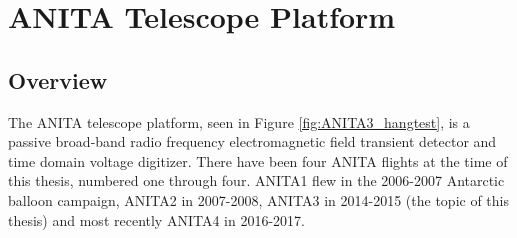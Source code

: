 
\chapter{ANITA Telescope Platform}
\section{Overview}
	The ANITA telescope platform, seen in Figure \ref{fig:ANITA3_hangtest}, is a passive broad-band radio frequency electromagnetic field transient detector and time domain voltage digitizer.  There have been four ANITA flights at the time of this thesis, numbered one through four.  ANITA1 flew in the 2006-2007 Antarctic balloon campaign\cite{ANITA1}, ANITA2 in 2007-2008\cite{ANITA2}, ANITA3 in 2014-2015 (the topic of this thesis) and most recently ANITA4 in 2016-2017.  
	
